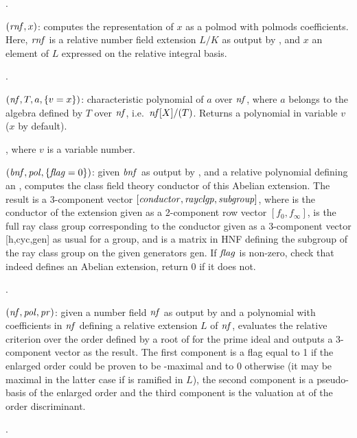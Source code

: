 .

$(\hbox{\it rnf\/},x)$: computes the representation of $x$
as a polmod with polmods coefficients. Here, $\hbox{\it rnf\/}$ is a relative number
field extension $L/K$ as output by , and $x$ an element of
$L$ expressed on the relative integral basis.

.

$(\hbox{\it nf\/},T,a,\{v=x\})$: characteristic polynomial of
$a$ over $\hbox{\it nf\/}$, where $a$ belongs to the algebra defined by $T$ over
$\hbox{\it nf\/}$, i.e.~$\hbox{\it nf\/}[X]/(T)$. Returns a polynomial in variable $v$
($x$ by default).

, where $v$ is a variable number.

$(\hbox{\it bnf\/},\hbox{\it pol\/},\{\hbox{\it f\kern0pt lag\/}=0\})$: given $\hbox{\it bnf\/}$
as output by , and  a relative polynomial defining an
, computes the class field theory conductor of this
Abelian extension. The result is a 3-component vector
$[\hbox{\it conductor\/},\hbox{\it rayclgp\/},\hbox{\it subgroup\/}]$, where  is
the conductor of the extension given as a 2-component row vector
$[f_0,f_\infty]$,  is the full ray class group corresponding to
the conductor given as a 3-component vector [h,cyc,gen] as usual for a group,
and  is a matrix in HNF defining the subgroup of the ray class
group on the given generators gen. If $\hbox{\it f\kern0pt lag\/}$ is non-zero, check that 
indeed defines an Abelian extension, return 0 if it does not.

.

$(\hbox{\it nf\/},\hbox{\it pol\/},\hbox{\it pr\/})$: given a number field
$\hbox{\it nf\/}$ as output by  and a polynomial  with
coefficients in $\hbox{\it nf\/}$ defining a relative extension $L$ of $\hbox{\it nf\/}$,
evaluates the relative  criterion over the order defined by a
root of  for the prime ideal  and outputs a 3-component
vector as the result. The first component is a flag equal to 1 if the
enlarged order could be proven to be -maximal and to 0 otherwise (it
may be maximal in the latter case if  is ramified in $L$), the second
component is a pseudo-basis of the enlarged order and the third component is
the valuation at  of the order discriminant.

.

